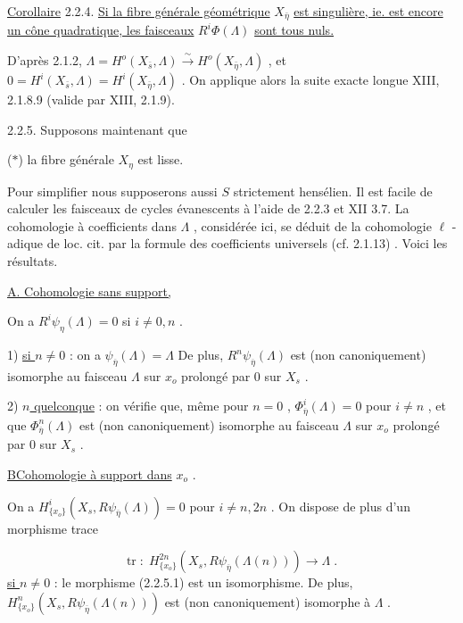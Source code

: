 \underline{Corollaire} 2.2.4. \underline{Si la fibre générale géométrique} $X_{\bar{\eta}}$ \underline{est singulière, ie. est encore un cône quadratique, les faisceaux} $R^i\Phi(\Lambda)$ \underline{sont tous nuls.}

D'après 2.1.2, $\Lambda = H^o(X_{\bar{s}},\Lambda) \stackrel{\sim}{\longrightarrow} H^o(X_{\bar{\eta}},\Lambda)$ , et $0 = H^i(X_{\bar{s}},\Lambda) = H^i(X_{\bar{\eta}},\Lambda)$ . On applique alors la suite exacte longue XIII, 2.1.8.9 (valide par XIII, 2.1.9).

2.2.5. Supposons maintenant que

($*$) la fibre générale $X_\eta$ est lisse.

Pour simplifier  nous supposerons aussi $S$ strictement hensélien. Il est facile de calculer les faisceaux de cycles évanescents à l'aide de 2.2.3 et XII 3.7. La cohomologie à coefficients dans $\Lambda$ , considérée ici, se déduit de la cohomologie $\ell$ - adique de loc. cit. par la formule des coefficients universels (cf. 2.1.13) . Voici les résultats.

\underline{A. Cohomologie sans support,}

On a $R^i\psi_\eta(\Lambda) = 0$ si $i \neq 0,n$ .



1) \underline{si $n \neq 0$} : on a $\psi_{\overline{\eta}}(\Lambda) = \Lambda$    De plus, $R^n\psi_{\overline{\eta}}(\Lambda)$ est (non canoniquement) isomorphe au faisceau $\Lambda$ sur $x_o$ prolongé par $0$ sur $X_s$ .

2) \underline{$n$ quelconque} : on vérifie que, même pour $n = 0$ , $\Phi^i_{\overline{\eta}}(\Lambda) = 0$ pour $i \neq n$ , et que $\Phi^n_{\overline{\eta}}(\Lambda)$ est (non canoniquement) isomorphe au faisceau $\Lambda$ sur $x_o$ prolongé par $0$ sur $X_s$ .


\underline{B\quad Cohomologie à support dans} $x_o$ .

On a $H^i_{\{x_o\}}(X_s,R\psi_{\overline{\eta}}(\Lambda)) = 0$ pour $i \neq n,2n$ . On dispose de plus d'un morphisme trace

\begin{equation}\tag{2.2.5.1}
\mathrm{tr} \; : \; H^{2n}_{\{x_o\}}(X_s,R\psi_{\overline{\eta}}(\Lambda(n))) \longrightarrow \Lambda \;.
\end{equation}
\underline{si $n \neq 0$} : le morphisme (2.2.5.1) est un isomorphisme. De plus, $H^n_{\{x_o\}}(X_s,R\psi_{\overline{\eta}}(\Lambda(n)))$ est (non canoniquement) isomorphe à $\Lambda$ .

